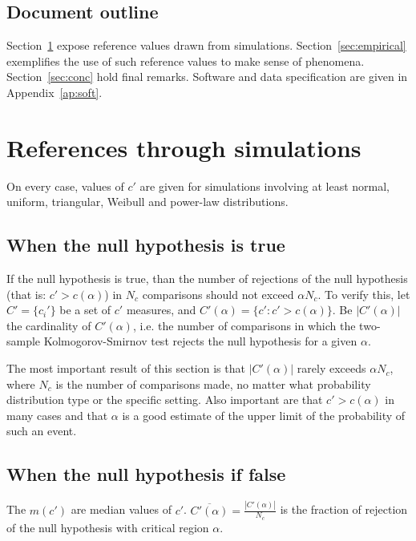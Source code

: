 \documentclass[%
	aip,
	jmp,%
	amsmath,amssymb,
	reprint,%
]{revtex4-1}
\begin{document}
\subsection{Document outline}
Section~\ref{sec:simulations} expose reference values drawn from simulations.
Section~\ref{sec:empirical} exemplifies the use of such reference values
to make sense of phenomena.
Section~\ref{sec:conc} hold final remarks.
Software and data specification are given in Appendix~\ref{ap:soft}.


\section{References through simulations}\label{sec:simulations}
On every case, values of $c'$ are given for simulations involving
at least normal, uniform, triangular, Weibull and power-law distributions.

\subsection{When the null hypothesis is true}
If the null hypothesis is true, than the number
of rejections of the null hypothesis (that is: $c'>c(\alpha)$)
in $N_c$ comparisons should not exceed $\alpha N_c$.
To verify this, let $C'=\{c_i'\}$ be a set of $c'$ measures,
and $C'(\alpha)=\{c' : c'>c(\alpha)\}$.
Be $|C'(\alpha)|$ the cardinality of $C'(\alpha)$,
i.e. the number of comparisons in which the two-sample Kolmogorov-Smirnov
test rejects the null hypothesis for a given $\alpha$.

The most important result of this section is that
$|C'(\alpha)|$ rarely exceeds $\alpha N_c$,
 where $N_c$ is the number of comparisons made,
no matter what probability distribution type
or the specific setting.
Also important are that
$c'>c(\alpha)$ in many cases
and that $\alpha$ is a good estimate of the upper limit of the probability
of such an event.





\subsection{When the null hypothesis if false}
The $m(c')$ are median values of $c'$.
$\overline{C'(\alpha)}=\frac{|C'(\alpha)|}{N_c}$ is the fraction
of rejection of the null hypothesis with critical region $\alpha$.





%
%
\end{document}
